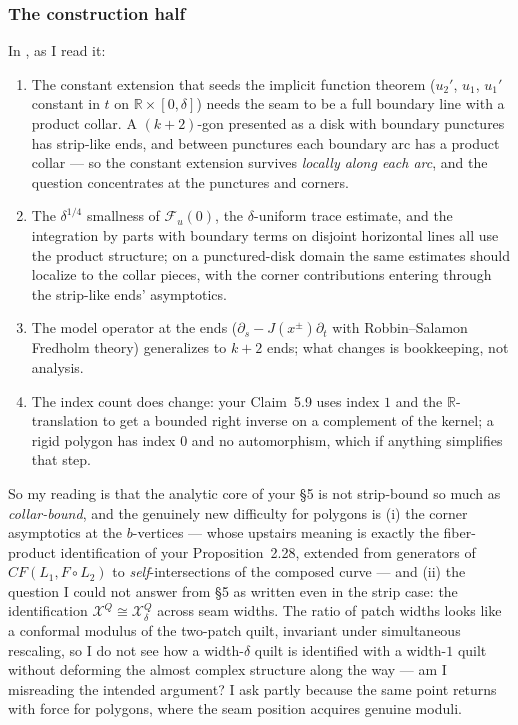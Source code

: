 \documentclass[11pt,reqno]{amsart}
\theoremstyle{plain}
\theoremstyle{definition}
\newcommand{\R}{\mathbb{R}}
\newcommand{\CF}{\mathit{CF}}
\newcommand{\bc}{b}
\begin{document}
\subsubsection*{The construction half}
In \cite{Z1}, as I read it:
\begin{enumerate}
\item The constant extension that seeds the implicit function theorem ($u_2'$, $u_1$, $u_1'$
constant in $t$ on $\R\times[0,\delta]$) needs the seam to be a full boundary line with a
product collar. A $(k{+}2)$-gon presented as a disk with boundary punctures has strip-like
ends, and between punctures each boundary arc has a product collar --- so the constant
extension survives \emph{locally along each arc}, and the question concentrates at the
punctures and corners.
\item The $\delta^{1/4}$ smallness of $\mathcal F_u(0)$, the $\delta$-uniform trace estimate,
and the integration by parts with boundary terms on disjoint horizontal lines all use the
product structure; on a punctured-disk domain the same estimates should localize to the collar
pieces, with the corner contributions entering through the strip-like ends' asymptotics.
\item The model operator at the ends ($\partial_s-J(x^\pm)\partial_t$ with Robbin--Salamon
Fredholm theory) generalizes to $k+2$ ends; what changes is bookkeeping, not analysis.
\item The index count does change: your Claim~5.9 uses index $1$ and the $\R$-translation to
get a bounded right inverse on a complement of the kernel; a rigid polygon has index $0$ and
no automorphism, which if anything simplifies that step.
\end{enumerate}
So my reading is that the analytic core of your \S5 is not strip-bound so much as
\emph{collar-bound}, and the genuinely new difficulty for polygons is (i) the corner
asymptotics at the $\bc$-vertices --- whose upstairs meaning is exactly the fiber-product
identification of your Proposition~2.28, extended from generators of $\CF(L_1,F\circ L_2)$ to
\emph{self}-intersections of the composed curve --- and (ii) the question I could not answer
from \S5 as written even in the strip case: the identification
$\mathcal X^Q\cong\mathcal X^Q_\delta$ across seam widths. The ratio of patch widths looks
like a conformal modulus of the two-patch quilt, invariant under simultaneous rescaling, so I
do not see how a width-$\delta$ quilt is identified with a width-$1$ quilt without deforming
the almost complex structure along the way --- am I misreading the intended argument? I ask
partly because the same point returns with force for polygons, where the seam position
acquires genuine moduli.
\end{document}
